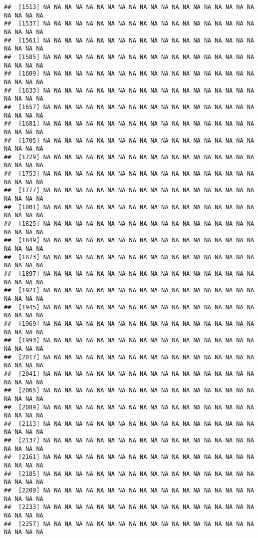 \documentclass[
]{article}
\begin{document}
\begin{verbatim}
##  [1513] NA NA NA NA NA NA NA NA NA NA NA NA NA NA NA NA NA NA NA NA NA NA NA NA
##  [1537] NA NA NA NA NA NA NA NA NA NA NA NA NA NA NA NA NA NA NA NA NA NA NA NA
##  [1561] NA NA NA NA NA NA NA NA NA NA NA NA NA NA NA NA NA NA NA NA NA NA NA NA
##  [1585] NA NA NA NA NA NA NA NA NA NA NA NA NA NA NA NA NA NA NA NA NA NA NA NA
##  [1609] NA NA NA NA NA NA NA NA NA NA NA NA NA NA NA NA NA NA NA NA NA NA NA NA
##  [1633] NA NA NA NA NA NA NA NA NA NA NA NA NA NA NA NA NA NA NA NA NA NA NA NA
##  [1657] NA NA NA NA NA NA NA NA NA NA NA NA NA NA NA NA NA NA NA NA NA NA NA NA
##  [1681] NA NA NA NA NA NA NA NA NA NA NA NA NA NA NA NA NA NA NA NA NA NA NA NA
##  [1705] NA NA NA NA NA NA NA NA NA NA NA NA NA NA NA NA NA NA NA NA NA NA NA NA
##  [1729] NA NA NA NA NA NA NA NA NA NA NA NA NA NA NA NA NA NA NA NA NA NA NA NA
##  [1753] NA NA NA NA NA NA NA NA NA NA NA NA NA NA NA NA NA NA NA NA NA NA NA NA
##  [1777] NA NA NA NA NA NA NA NA NA NA NA NA NA NA NA NA NA NA NA NA NA NA NA NA
##  [1801] NA NA NA NA NA NA NA NA NA NA NA NA NA NA NA NA NA NA NA NA NA NA NA NA
##  [1825] NA NA NA NA NA NA NA NA NA NA NA NA NA NA NA NA NA NA NA NA NA NA NA NA
##  [1849] NA NA NA NA NA NA NA NA NA NA NA NA NA NA NA NA NA NA NA NA NA NA NA NA
##  [1873] NA NA NA NA NA NA NA NA NA NA NA NA NA NA NA NA NA NA NA NA NA NA NA NA
##  [1897] NA NA NA NA NA NA NA NA NA NA NA NA NA NA NA NA NA NA NA NA NA NA NA NA
##  [1921] NA NA NA NA NA NA NA NA NA NA NA NA NA NA NA NA NA NA NA NA NA NA NA NA
##  [1945] NA NA NA NA NA NA NA NA NA NA NA NA NA NA NA NA NA NA NA NA NA NA NA NA
##  [1969] NA NA NA NA NA NA NA NA NA NA NA NA NA NA NA NA NA NA NA NA NA NA NA NA
##  [1993] NA NA NA NA NA NA NA NA NA NA NA NA NA NA NA NA NA NA NA NA NA NA NA NA
##  [2017] NA NA NA NA NA NA NA NA NA NA NA NA NA NA NA NA NA NA NA NA NA NA NA NA
##  [2041] NA NA NA NA NA NA NA NA NA NA NA NA NA NA NA NA NA NA NA NA NA NA NA NA
##  [2065] NA NA NA NA NA NA NA NA NA NA NA NA NA NA NA NA NA NA NA NA NA NA NA NA
##  [2089] NA NA NA NA NA NA NA NA NA NA NA NA NA NA NA NA NA NA NA NA NA NA NA NA
##  [2113] NA NA NA NA NA NA NA NA NA NA NA NA NA NA NA NA NA NA NA NA NA NA NA NA
##  [2137] NA NA NA NA NA NA NA NA NA NA NA NA NA NA NA NA NA NA NA NA NA NA NA NA
##  [2161] NA NA NA NA NA NA NA NA NA NA NA NA NA NA NA NA NA NA NA NA NA NA NA NA
##  [2185] NA NA NA NA NA NA NA NA NA NA NA NA NA NA NA NA NA NA NA NA NA NA NA NA
##  [2209] NA NA NA NA NA NA NA NA NA NA NA NA NA NA NA NA NA NA NA NA NA NA NA NA
##  [2233] NA NA NA NA NA NA NA NA NA NA NA NA NA NA NA NA NA NA NA NA NA NA NA NA
##  [2257] NA NA NA NA NA NA NA NA NA NA NA NA NA NA NA NA NA NA NA NA NA NA NA NA

\end{verbatim}
\end{document}
